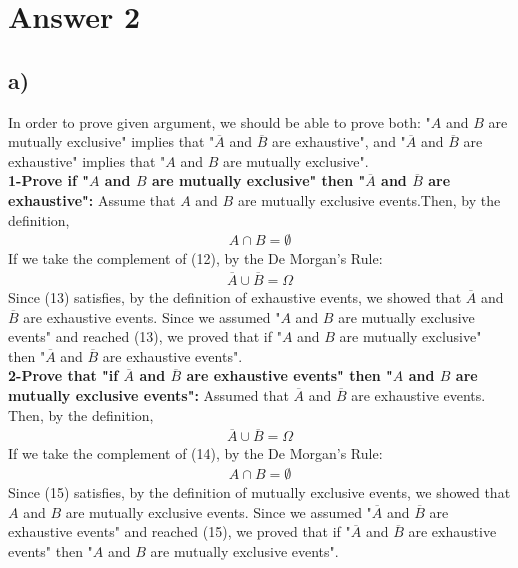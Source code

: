 \documentclass[12pt]{article}
\begin{document}
\section*{Answer 2}
\subsection*{a)}In order to prove given argument, we should be able to prove both: "$A$ and $B$ are mutually exclusive" implies that "$\overline{A}$ and $\overline{B}$ are exhaustive", and "$\overline{A}$ and $\overline{B}$ are exhaustive" implies that "$A$ and $B$ are mutually exclusive". \\
\textbf{1-Prove if "$A$ and $B$ are mutually exclusive" then "$\overline{A}$ and $\overline{B}$ are exhaustive":} Assume that $A$ and $B$ are mutually exclusive events.Then, by the definition, 
\begin{equation} 
\begin{split}
A \cap B = \emptyset
\end{split}
\end{equation}
If we take the complement of (12), by the De Morgan's Rule:
\begin{equation} 
\begin{split}
\overline{A} \cup \overline{B} = \Omega
\end{split}
\end{equation}
Since (13) satisfies, by the definition of exhaustive events, we showed that $\overline{A}$ and $\overline{B}$ are exhaustive events. Since we assumed "$A$ and $B$ are mutually exclusive events" and reached (13), we proved that if "$A$ and $B$ are mutually exclusive" then "$\overline{A}$ and $\overline{B}$ are exhaustive events". \\
\textbf{2-Prove that "if $\overline{A}$ and $\overline{B}$ are exhaustive events" then "$A$ and $B$ are mutually exclusive events":} Assumed that $\overline{A}$ and $\overline{B}$ are exhaustive events. Then, by the definition,
\begin{equation} 
\begin{split}
\overline{A} \cup \overline{B} = \Omega
\end{split}
\end{equation}
If we take the complement of (14), by the De Morgan's Rule:
\begin{equation} 
\begin{split}
A \cap B = \emptyset
\end{split}
\end{equation}
Since (15) satisfies, by the definition of mutually exclusive events, we showed that $A$ and $B$ are mutually exclusive events. Since we assumed "$\overline{A}$ and $\overline{B}$ are exhaustive events" and reached (15), we proved that if "$\overline{A}$ and $\overline{B}$ are exhaustive events" then "$A$ and $B$ are mutually exclusive events". \\ \\
\end{document}
